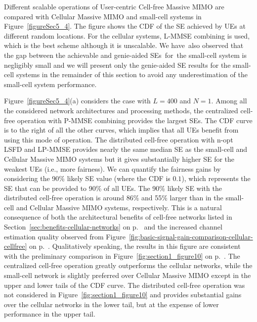 Different scalable operations of User-centric Cell-free Massive MIMO are compared with Cellular Massive MIMO and small-cell systems in Figure~\ref{figureSec5_4}. 
 The figure shows the CDF of the SE achieved by UEs at different random locations.  For the cellular systems, L-MMSE combining is used, which is the best scheme although it is unscalable. We have~also observed that the gap between the achievable and genie-aided SEs~for~the small-cell system is negligibly small and we will present only the genie-aided SE results for the small-cell systems in the remainder of this section to avoid any underestimation of the small-cell system performance.
 
Figure~\ref{figureSec5_4}(a) considers the case with $L=400$ and $N=1$.
Among all the considered network architectures and processing methods, the centralized cell-free operation with P-MMSE combining provides  the largest SEs. The CDF curve is to the right of all the other curves, which implies that all UEs benefit from using this mode of operation. The distributed cell-free operation with n-opt LSFD and LP-MMSE provides nearly the same median SE as the small-cell and Cellular Massive MIMO systems but it gives substantially higher SE for the weakest UEs (i.e., more fairness).  We can quantify the fairness gains by considering the 90\% likely SE value (where the CDF is $0.1$), which represents the SE that can be provided to 90\% of all UEs. The 90\% likely SE with the distributed cell-free operation is around 86\% and 55\% larger than in the small-cell and Cellular Massive MIMO systems, respectively. This is a natural consequence of both the architectural benefits of cell-free networks listed in Section~\ref{sec:benefits-cellular-networks} on p.~\pageref{sec:benefits-cellular-networks} and the increased channel estimation quality  observed from Figure~\ref{fig:basic-signal-gain-comparison-cellular-cellfree} on p.~\pageref{fig:basic-signal-gain-comparison-cellular-cellfree}. 
Qualitatively speaking, the results in this figure are consistent with the preliminary comparison in Figure~\ref{fig:section1_figure10} on p.~\pageref{fig:section1_figure10}. The centralized cell-free operation greatly outperforms the cellular networks, while the small-cell network is slightly preferred over Cellular Massive MIMO except in the upper and lower tails of the CDF curve. The distributed cell-free operation was not considered in Figure~\ref{fig:section1_figure10} and provides substantial gains over the cellular networks in the lower tail, but at the expense of lower performance in the upper tail.
 
